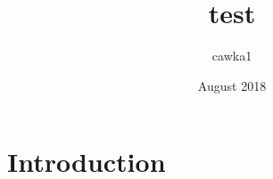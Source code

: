 \documentclass{article}
\title{test}
\author{cawka1 }
\date{August 2018}
\begin{document}
\maketitle

\section{Introduction}
\end{document}
